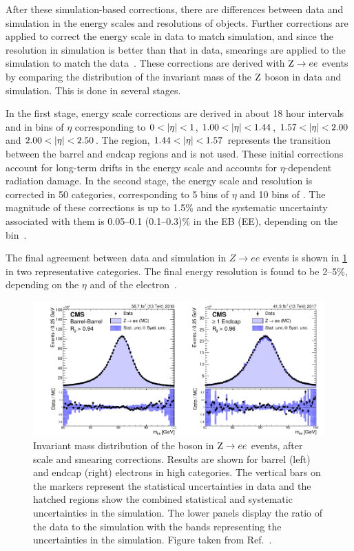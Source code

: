 After these simulation-based corrections, there are differences between data and simulation in the energy scales and resolutions of \eg objects. Further corrections are applied to correct the energy scale in data to match simulation, and since the resolution in simulation is better than that in data, smearings are applied to the simulation to match the data~\cite{CMS:2020uim}. These corrections are derived with $\mathrm{Z}\rightarrow ee$ events by comparing the distribution of the invariant mass of the $\mathrm{Z}$ boson in data and simulation. This is done in several stages. 

In the first stage, energy scale corrections are derived in about 18 hour intervals and in bins of $\eta$ corresponding to $0 < \lvert \eta \rvert < 1$, $1.00 < \lvert \eta \rvert < 1.44$, $1.57 < \lvert \eta \rvert < 2.00$ and $2.00 < \lvert \eta \rvert < 2.50$. The region, $1.44 < \lvert \eta \rvert < 1.57$ represents the transition between the barrel and endcap regions and is not used. These initial corrections account for long-term drifts in the energy scale and accounts for $\eta$-dependent radiation damage. In the second stage, the energy scale and resolution is corrected in 50 categories, corresponding to 5 bins of $\eta$ and 10 bins of \RNINE. The magnitude of these corrections is up to 1.5\% and the systematic uncertainty associated with them is 0.05--0.1 (0.1--0.3)\% in the EB (EE), depending on the \RNINE bin~\cite{CMS:2020uim}. 

The final agreement between data and simulation in $Z\rightarrow ee$ events is shown in \cref{fig:zee_after_corrections} in two representative categories. The final energy resolution is found to be 2--5\%, depending on the $\eta$ and \RNINE of the electron~\cite{CMS:2020uim}. 

\begin{figure}
  \centering
  \includegraphics[width=\textwidth]{Figures/Detector/CMS/zee_after_corrections.pdf}
  \caption[Electron Energy Scale Agreement Between Simulation and Data]{Invariant mass distribution of the \PZ boson in $\mathrm{Z}\to ee$ events, after scale and smearing corrections. Results are shown for barrel (left) and endcap (right) electrons in high \RNINE categories. The vertical bars on the markers represent the statistical uncertainties in data and the hatched regions show the combined statistical and systematic uncertainties in the simulation. The lower panels display the ratio of the data to the simulation with the bands representing the uncertainties in the simulation. Figure taken from Ref.~\cite{CMS:2020uim}.}\label{fig:zee_after_corrections}
\end{figure}